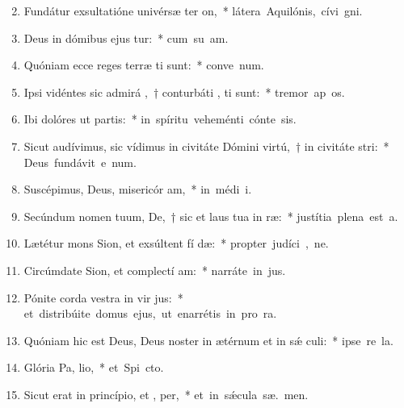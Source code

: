 \begin{flushleft}
\begin{enumerate}[leftmargin=*]
\setcounter{enumi}{1}

\item Fundátur exsultatióne univérsæ ter  on,~* \mbox{látera Aquilónis, cívi  gni.}
\item Deus in dómibus ejus tur:~* \mbox{cum su am.}
\item Quóniam ecce reges terræ ti sunt:~* \mbox{conve  num.}
\item Ipsi vidéntes sic admirá ,~† conturbáti , ti sunt:~* \mbox{tremor ap os.}
\item Ibi dolóres ut partis:~* \mbox{in spíritu veheménti cónte  sis.}
\item Sicut audívimus, sic vídimus in civitáte Dómini virtú,~† in civitáte  stri:~* \mbox{Deus fundávit e  num.}
\item Suscépimus, Deus, misericór am,~* \mbox{in médi  i.}
\item Secúndum nomen tuum, De,~† sic et laus tua in  ræ:~* \mbox{justítia plena est  a.}
\item Lætétur mons Sion, et exsúltent fí dæ:~* \mbox{propter judíci , ne.}
\item Circúmdate Sion, et complectí am:~* \mbox{narráte in  jus.}
\item Pónite corda vestra in vir jus:~* \mbox{et distribúite domus ejus, ut enarrétis in pro ra.}
\item Quóniam hic est Deus, Deus noster in ætérnum et in s\'{\ae} culi:~* \mbox{ipse re   la.}
\item Glória Pa,  lio,~* \mbox{et Spi cto.}
\item Sicut erat in princípio, et ,  per,~* \mbox{et in s\'{\ae}cula sæ. men.}


\end{enumerate}
\end{flushleft}
